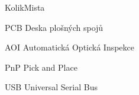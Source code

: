 \begin{seznamzkratek}{KolikMista}



		{PCB}								%
		{Deska plošných spojů}

		{AOI} %
		{Automatická Optická Inspekce}					%

		{PnP} %
		{Pick and Place}					%

		{USB} %
		{Universal Serial Bus}					%
		
\end{seznamzkratek}
